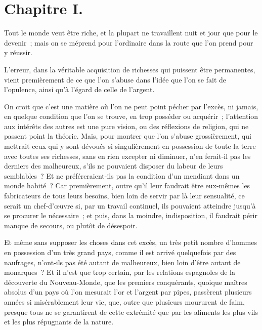 \documentclass[french,twoside]{book} %
\newcommand\chaptercont{} %
\begin{document}
\chaptercont
\section[{Chapitre I.}]{Chapitre I.}
\noindent Tout le monde veut être riche, et la plupart ne travaillent nuit et jour que pour le devenir ; mais on se méprend pour l’ordinaire dans la route que l’on prend pour y réussir.\par
L’erreur, dans la véritable acquisition de richesses qui puissent être permanentes, vient premièrement de ce que l’on s’abuse dans l’idée que l’on se fait de l’opulence, ainsi qu’à l’égard de celle de l’argent.\par
On croit que c’est une matière où l’on ne peut point pécher par l’excès, ni jamais, en quelque condition que l’on se trouve, en trop posséder ou acquérir ; l’attention aux intérêts des autres est une pure vision, ou des réflexions de religion, qui ne passent point la théorie. Mais, pour montrer que l’on s’abuse grossièrement, qui mettrait ceux qui y sont dévoués si singulièrement en possession de toute la terre avec toutes ses richesses, sans en rien excepter ni diminuer, n’en ferait-il pas les derniers des malheureux, s’ils ne pouvaient disposer du labeur de leurs semblables ? Et ne préféreraient-ils pas la condition d’un mendiant dans un monde habité ? Car premièrement, outre qu’il leur faudrait être eux-mêmes les fabricateurs de tous leurs besoins, bien loin de servir par là leur sensualité, ce serait un chef-d’œuvre si, par un travail continuel, ils pouvaient atteindre jusqu’à se procurer le nécessaire ; et puis, dans la moindre, indisposition, il faudrait périr manque de secours, ou plutôt de désespoir.\par
Et même sans supposer les choses dans cet excès, un très petit nombre d’hommes en possession d’un très grand pays, comme il est arrivé quelquefois par des naufrages, n’ont-ils pas été autant de malheureux, bien loin d’être autant de monarques ? Et il n’est que trop certain, par les relations espagnoles de la découverte du Nouveau-Monde, que les premiers conquérants, quoique maîtres absolus d’un pays où l’on mesurait l’or et l’argent par pipes, passèrent plusieurs années si misérablement leur vie, que, outre que plusieurs moururent de faim, presque tous ne se garantirent de cette extrémité que par les aliments les plus vils et les plus répugnants de la nature.\par
\end{document}

